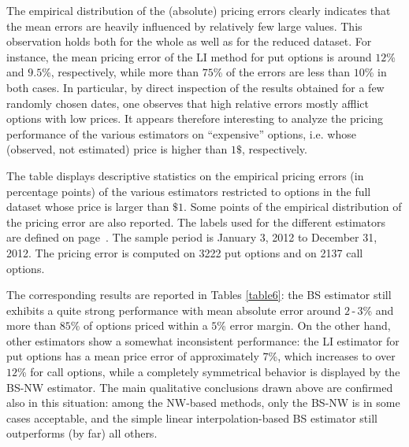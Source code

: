 \documentclass[11pt]{article}
\theoremstyle{remark}
\begin{document}
\medskip

The empirical distribution of the (absolute) pricing errors clearly
indicates that the mean errors are heavily influenced by relatively
few large values. This observation holds both for the whole as well as
for the reduced dataset. For instance, the mean pricing error of the
LI method for put options is around $12$\% and $9.5$\%, respectively,
while more than $75$\% of the errors are less than $10$\% in both
cases. In particular, by direct inspection of the results obtained for
a few randomly chosen dates, one observes that high relative errors
mostly afflict options with low prices. It appears therefore
interesting to analyze the pricing performance of the various
estimators on ``expensive'' options, i.e. whose (observed, not
estimated) price is higher than $1\$$, respectively. 

\begin{table}[tbp]
\caption{Pricing errors on options with price larger than $\$1$ (full dataset)}
\begin{center}
\vspace{2mm}
\parbox{\textwidth}{\footnotesize The table displays descriptive
  statistics on the empirical pricing errors (in percentage points) of
  the various estimators restricted to options in the full dataset
  whose price is larger than $\$1$. Some points of the empirical
  distribution of the pricing error are also reported.  The labels
  used for the different estimators are defined on
  page~\pageref{etichette}. The sample period is January 3, 2012 to
  December 31, 2012. The pricing error is computed on 3222 put options
  and on 2137 call options. \vspace{4mm}}
\footnotesize{{}}
\end{center}
\label{table6}
\end{table}

The corresponding results are reported in Tables \ref{table6}: the BS
estimator still exhibits a quite strong performance with mean absolute
error around $2$\,-\,$3$\% and more than $85$\% of options priced
within a $5$\% error margin. On the other hand, other estimators show
a somewhat inconsistent performance: the LI estimator for put options
has a mean price error of approximately $7$\%, which increases to over
$12$\% for call options, while a completely symmetrical behavior is
displayed by the BS-NW estimator. The main qualitative conclusions
drawn above are confirmed also in this situation: among the NW-based
methods, only the BS-NW is in some
cases acceptable, and the simple linear interpolation-based BS
estimator still outperforms (by far) all others. 
\end{document}
